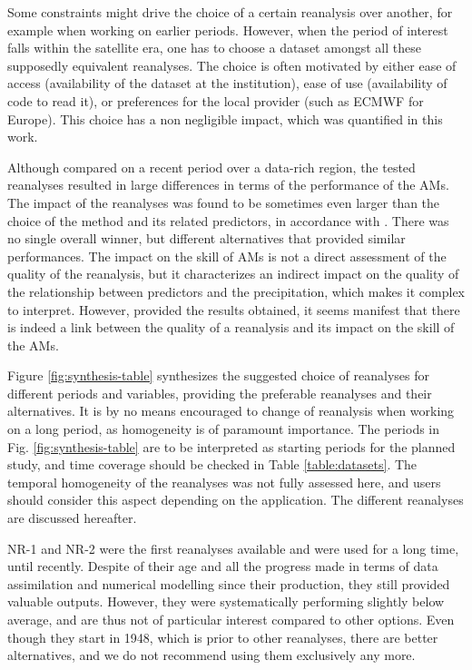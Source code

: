 \documentclass{ametsoc}
\begin{document}
Some constraints might drive the choice of a certain reanalysis over another, for example when working on earlier periods. However, when the period of interest falls within the satellite era, one has to choose a dataset amongst all these supposedly equivalent reanalyses. The choice is often motivated by either ease of access (availability of the dataset at the institution), ease of use (availability of code to read it), or  preferences for the local provider (such as ECMWF for Europe). This choice has a non negligible impact, which was quantified in this work.

Although compared on a recent period over a data-rich region, the tested reanalyses resulted in large differences in terms of the performance of the AMs. The impact of the reanalyses was found to be sometimes even larger than the choice of the method and its related predictors, in accordance with \citet{Dayon2015}. There was no single overall winner, but different alternatives that provided similar performances. The impact on the skill of AMs is not a direct assessment of the quality of the reanalysis, but it characterizes an indirect impact on the quality of the relationship between predictors and the precipitation, which makes it complex to interpret. However, provided the results obtained, it seems manifest that there is indeed a link between the quality of a reanalysis and its impact on the skill of the AMs.

Figure \ref{fig:synthesis-table} synthesizes the suggested choice of reanalyses for different periods and variables, providing the preferable reanalyses and their alternatives. It is by no means encouraged to change of reanalysis when working on a long period, as homogeneity is of paramount importance. The periods in Fig. \ref{fig:synthesis-table} are to be interpreted as starting periods for the planned study, and time coverage should be checked in Table \ref{table:datasets}. The temporal homogeneity of the reanalyses was not fully assessed here, and users should consider this aspect depending on the application. The different reanalyses are discussed hereafter.

NR-1 and NR-2 were the first reanalyses available and were used for a long time, until recently. Despite of their age and all the progress made in terms of data assimilation and numerical modelling since their production, they still provided valuable outputs. However, they were systematically performing slightly below average, and are thus not of particular interest compared to other options. Even though they start in 1948, which is prior to other reanalyses, there are better alternatives, and we do not recommend using them exclusively any more.
\end{document}
